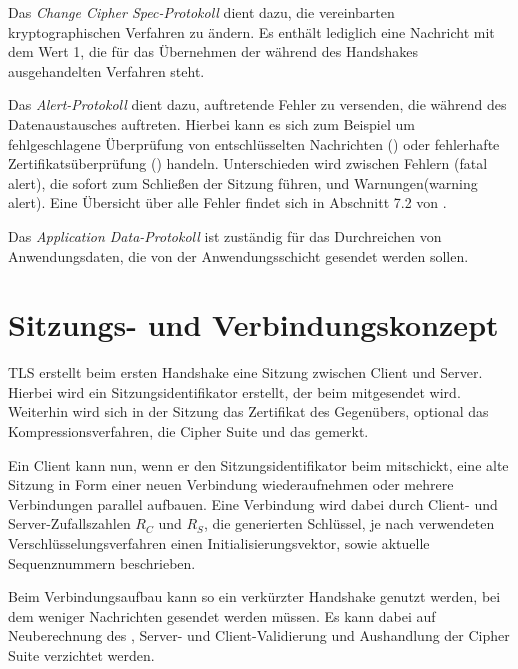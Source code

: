 Das \emph{Change Cipher Spec-Protokoll} dient dazu, die vereinbarten kryptographischen Verfahren zu ändern. Es enthält lediglich eine Nachricht mit dem Wert 1, die für das Übernehmen der während des Handshakes ausgehandelten Verfahren steht. 

Das \emph{Alert-Protokoll} dient dazu, auftretende Fehler zu versenden, die während des Datenaustausches auftreten. Hierbei kann es sich zum Beispiel um fehlgeschlagene Überprüfung von entschlüsselten Nachrichten (\badrecordmac{}) oder fehlerhafte Zertifikatsüberprüfung (\badcertificate{}) handeln. Unterschieden wird zwischen Fehlern (fatal alert), die sofort zum Schließen der Sitzung führen, und Warnungen(warning alert). Eine Übersicht über alle Fehler findet sich in Abschnitt 7.2 von \cite{tls12}.

Das \emph{Application Data-Protokoll} ist zuständig für das Durchreichen von Anwendungsdaten, die von der Anwendungsschicht gesendet werden sollen.

\section{Sitzungs- und Verbindungskonzept}

TLS erstellt beim ersten Handshake eine Sitzung zwischen Client und Server. Hierbei wird ein Sitzungsidentifikator erstellt, der beim \serverhello{} mitgesendet wird. Weiterhin wird sich in der Sitzung das Zertifikat des Gegenübers, optional das Kompressionsverfahren, die Cipher Suite und das \mastersecret{} gemerkt.

Ein Client kann nun, wenn er den Sitzungsidentifikator beim \clienthello{} mitschickt, eine alte Sitzung in Form einer neuen Verbindung wiederaufnehmen oder mehrere Verbindungen parallel aufbauen. Eine Verbindung wird dabei durch Client- und Server-Zufallszahlen \(R_C\) und \(R_S\), die generierten Schlüssel, je nach verwendeten Verschlüsselungsverfahren einen Initialisierungsvektor, sowie aktuelle Sequenznummern beschrieben.

Beim Verbindungsaufbau kann so ein verkürzter Handshake genutzt werden, bei dem weniger Nachrichten gesendet werden müssen. Es kann dabei auf Neuberechnung des \mastersecret{}, Server- und Client-Validierung und Aushandlung der Cipher Suite verzichtet werden.


